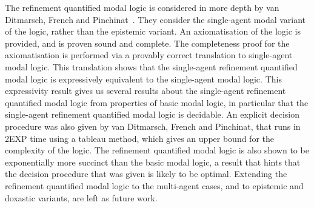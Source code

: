 The refinement quantified modal logic is considered in more depth by van
Ditmarsch, French and Pinchinat~\cite{french2010future}. They consider the
single-agent modal variant of the logic, rather than the epistemic variant. An
axiomatisation of the logic is provided, and is proven sound and complete. The
completeness proof for the axiomatisation is performed via a provably correct
translation to single-agent modal logic. This translation shows that the
single-agent refinement quantified modal logic is expressively equivalent to the
single-agent modal logic. This expressivity result gives us several results
about the single-agent refinement quantified modal logic from properties of
basic modal logic, in particular that the single-agent refinement quantified
modal logic is decidable. An explicit decision procedure was also given by van
Ditmarsch, French and Pinchinat, that runs in 2EXP time using a tableau method,
which gives an upper bound for the complexity of the logic. The refinement
quantified modal logic is also shown to be exponentially more succinct than the
basic modal logic, a result that hints that the decision procedure that was
given is likely to be optimal. Extending the refinement quantified modal logic
to the multi-agent cases, and to epistemic and doxastic variants, are left as
future work.
